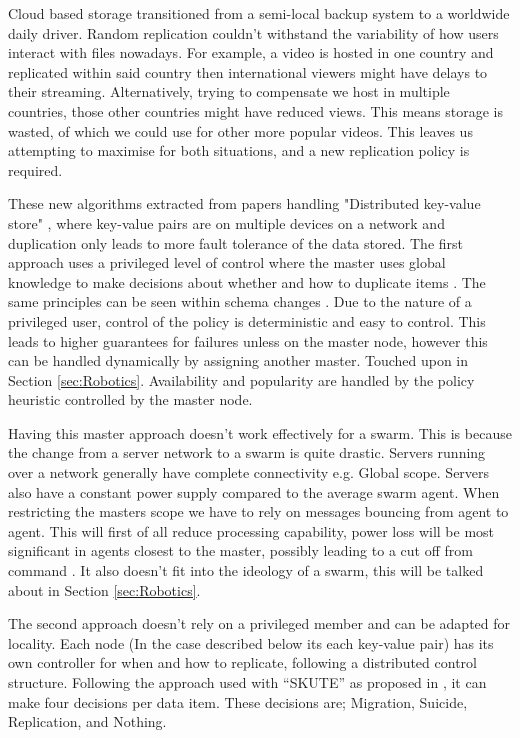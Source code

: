 \documentclass{UoYCSproject}
\begin{document}
Cloud based storage transitioned from a semi-local backup system to a worldwide daily driver.
Random replication couldn’t withstand the variability of how users interact with files nowadays.
For example, a video is hosted in one country and replicated within said country then international viewers might have delays to their streaming.
Alternatively, trying to compensate we host in multiple countries, those other countries might have reduced views.
This means storage is wasted, of which we could use for other more popular videos.
This leaves us attempting to maximise for both situations, and a new replication policy is required.

These new algorithms extracted from papers handling "Distributed key-value store" \cite{Key-Value}, where key-value pairs are on multiple devices on a network and duplication only leads to more fault tolerance of the data stored.
The first approach uses a privileged level of control where the master uses global knowledge to make decisions about whether and how to duplicate items \cite{Avalability storage, Patent}.
The same principles can be seen within schema changes \cite{Scheme changes}.
Due to the nature of a privileged user, control of the policy is deterministic and easy to control.
This leads to higher guarantees for failures unless on the master node, however this can be handled dynamically by assigning another master. 
Touched upon in Section \ref{sec:Robotics}.
Availability and popularity are handled by the policy heuristic controlled by the master node.

Having this master approach doesn’t work effectively for a swarm.
This is because the change from a server network to a swarm is quite drastic.
Servers running over a network generally have complete connectivity e.g. Global scope.
Servers also have a constant power supply compared to the average swarm agent.
When restricting the masters scope we have to rely on messages bouncing from agent to agent.
This will first of all reduce processing capability, power loss will be most significant in agents closest to the master, possibly leading to a cut off from command \cite{Swarm robotics reviewed}.
It also doesn’t fit into the ideology of a swarm, this will be talked about in Section \ref{sec:Robotics}.

The second approach doesn’t rely on a privileged member and can be adapted for locality.
Each node (In the case described below its each key-value pair) has its own controller for when and how to replicate, following a distributed control structure.
Following the approach used with “SKUTE” as proposed in \cite{Distributed Storage}, it can make four decisions per data item.
These decisions are; Migration, Suicide, Replication, and Nothing.
\end{document}
